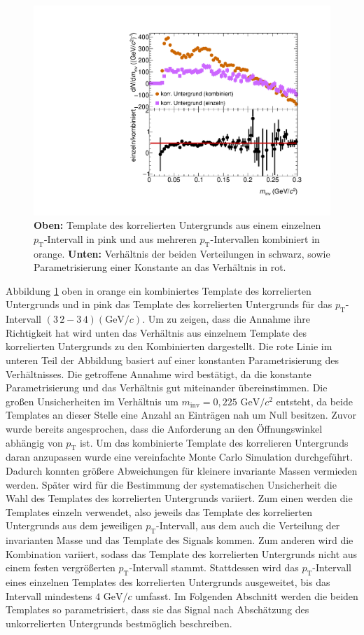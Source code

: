 \begin{figure}[tp]
\centering
\includegraphics[width=.7\linewidth]{BackgroundWithRatio10_Data_2016.pdf}
\caption{\textbf{Oben:} Template des korrelierten Untergrunds aus einem einzelnen $p_\text{T}$-Intervall in pink und aus mehreren $p_\text{T}$-Intervallen kombiniert in orange.
\textbf{Unten:} Verhältnis der beiden Verteilungen in schwarz, sowie Parametrisierung einer Konstante an das Verhältnis in rot.}
\label{fig:BkgTempRatio}
\end{figure}
\newline
Abbildung \ref{fig:BkgTempRatio} oben in orange ein kombiniertes Template des korrelierten Untergrunds und in pink das Template des korrelierten Untergrunds für das $p_\text{T}$-Intervall $(3\,2 - 3\,4) (\text{GeV/}c)$.
Um zu zeigen, dass die Annahme ihre Richtigkeit hat wird unten das Verhältnis aus einzelnem Template des korrelierten Untergrunds zu den Kombinierten dargestellt.
Die rote Linie im unteren Teil der Abbildung basiert auf einer konstanten Parametrisierung des Verhältnisses.
Die getroffene Annahme wird bestätigt, da die konstante Parametrisierung und das Verhältnis gut miteinander übereinstimmen.
Die großen Unsicherheiten im Verhältnis um $m_\text{inv} = 0,225\text{ GeV}/c^{2}$ entsteht, da beide Templates an dieser Stelle eine Anzahl an Einträgen nah um Null besitzen.
\newline
Zuvor wurde bereits angesprochen, dass die Anforderung an den Öffnungswinkel abhängig von $p_\text{T}$ ist.
Um das kombinierte Template des korrelieren Untergrunds daran anzupassen wurde eine vereinfachte Monte Carlo Simulation durchgeführt.
Dadurch konnten größere Abweichungen für kleinere invariante Massen vermieden werden.
\newline
Später wird für die Bestimmung der systematischen Unsicherheit die Wahl des Templates des korrelierten Untergrunds variiert.
Zum einen werden die Templates einzeln verwendet, also jeweils das Template des korrelierten Untergrunds aus dem jeweiligen $p_\text{T}$-Intervall, aus dem auch die Verteilung der invarianten Masse und das Template des Signals kommen.
Zum anderen wird die Kombination variiert, sodass das Template des korrelierten Untergrunds nicht aus einem festen vergrößerten $p_\text{T}$-Intervall stammt.
Stattdessen wird das $p_\text{T}$-Intervall eines einzelnen Templates des korrelierten Untergrunds ausgeweitet, bis das Intervall mindestens $4\text{ GeV}/c$ umfasst.
\newline
Im Folgenden Abschnitt werden die beiden Templates so parametrisiert, dass sie das Signal nach Abschätzung des unkorrelierten Untergrunds bestmöglich beschreiben.